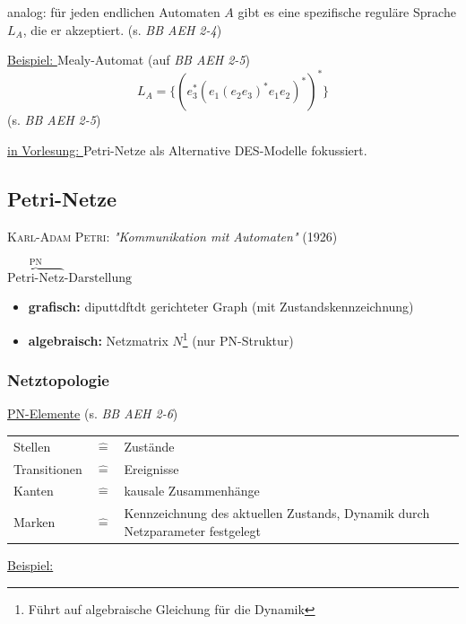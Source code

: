 \documentclass[12pt,a4paper]{scrartcl}
\numberwithin{equation}{section}
\begin{document}

analog: für jeden endlichen Automaten $A$ gibt es eine spezifische reguläre Sprache $L_A$, die er akzeptiert. (s. \textit{BB AEH 2-4})

\underline{Beispiel: } Mealy-Automat (auf \textit{BB AEH 2-5})
\begin{equation}
	L_A = \{ (e_3^{\ast}(e_1 (e_2 e_3)^{\ast} e_1 e_2)^{\ast})^{\ast} \}
\end{equation}
(s. \textit{BB AEH 2-5})

\underline{in Vorlesung: } Petri-Netze als Alternative DES-Modelle fokussiert.

\subsection{Petri-Netze}
\textsc{Karl-Adam Petri}: \textit{"Kommunikation mit Automaten"} (1926)

\underline{$\overbrace{\text{Petri-Netz}}^{\text{PN}}\text{-Darstellung}$}

\begin{itemize}
	\item \textbf{grafisch:} diputtdftdt gerichteter Graph (mit Zustandskennzeichnung)
	\item \textbf{algebraisch:} Netzmatrix $N$\footnote{Führt auf algebraische Gleichung für die Dynamik} (nur PN-Struktur) 
\end{itemize}

\subsubsection{Netztopologie}

\underline{PN-Elemente} (s. \textit{BB AEH 2-6})

\begin{tabularx}{0.9\linewidth}{p{2.1cm}p{0.1cm}X}
	Stellen & $\mathrel{\hat{=}}$ & Zustände \\
	Transitionen & $\mathrel{\hat{=}}$ & Ereignisse \\
	Kanten & $\mathrel{\hat{=}}$ & kausale Zusammenhänge \\
	Marken & $\mathrel{\hat{=}}$ & Kennzeichnung des aktuellen Zustands, Dynamik durch Netzparameter festgelegt \\
\end{tabularx}

\underline{Beispiel:}
\end{document}
